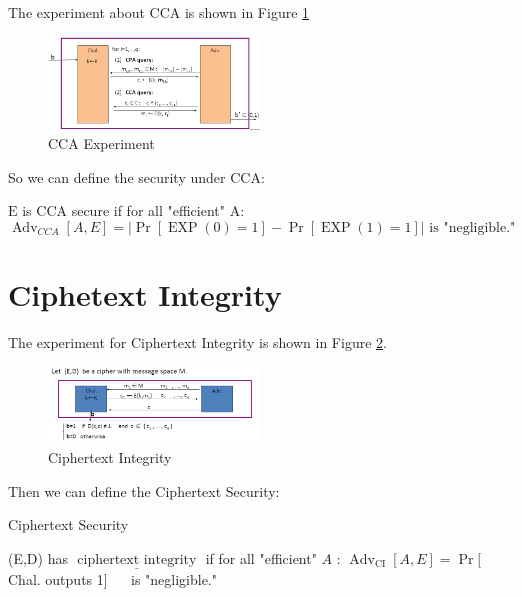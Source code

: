The experiment about CCA is shown in Figure \ref{fig: 05 CCA Experiment}

\begin{figure}[h]
    \centering
    \includegraphics[width=0.5\textwidth]{Stanford_Crypto_1/fig/05_Authentication/CCA Experiment.png}
    \caption{CCA Experiment}
    \label{fig: 05 CCA Experiment}
\end{figure}

So we can define the security under CCA:

\begin{definition} 
    $\mathrm{E}$ is CCA secure if for all "efficient" A:
    $$
    \operatorname{Adv}_{C C A}[A, E]=|\operatorname{Pr}[\operatorname{EXP}(0)=1]-\operatorname{Pr}[\operatorname{EXP}(1)=1]| \text { is "negligible." }
    $$
    
\end{definition}

\section{Ciphetext Integrity}

The experiment for Ciphertext Integrity is shown in Figure \ref{fig: 05 Ciphertext Integrity}.

\begin{figure}[h]
    \centering
    \includegraphics[width=0.5\textwidth]{Stanford_Crypto_1/fig/05_Authentication/Ciphertext Integrity.png}
    \caption{Ciphertext Integrity}
    \label{fig: 05 Ciphertext Integrity}
\end{figure}

Then we can define the Ciphertext Security:

\begin{definition}  Ciphertext Security
    
    (E,D) has $\underline{\text { ciphertext integrity }}$ if for all "efficient" $A$ :
    $\operatorname{Adv}_{\mathrm{CI}}[A, E]=\operatorname{Pr}[$ Chal. outputs 1] $\quad$ is "negligible."
    
\end{definition}


